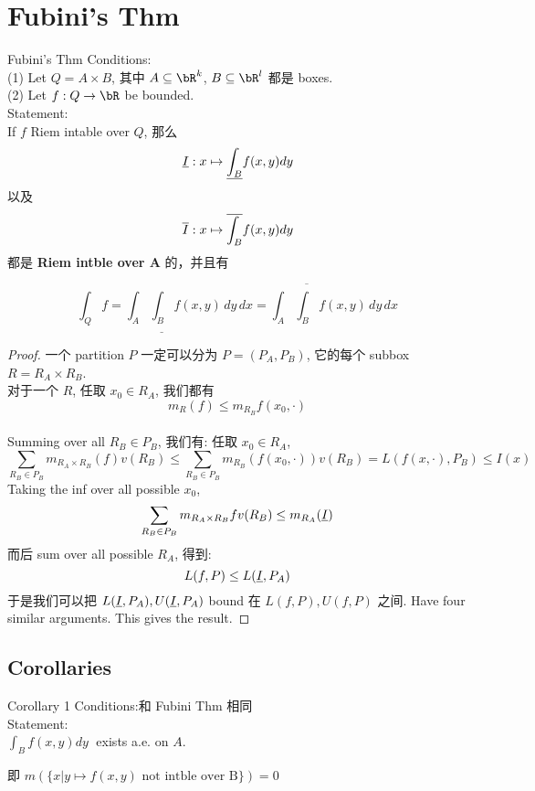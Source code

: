 \documentclass[lang=cn,11pt]{elegantbook}
\begin{document}
\section{Fubini's Thm}
\begin{theorem}{Fubini's Thm}\label{Fubini's Thm}
    Conditions:\\
    (1) Let $Q = A \times B$, 其中 $A \subseteq \bR^k$, $B \subseteq \bR^l$ 都是 boxes.\\
    (2) Let $f: Q \rightarrow \bR$ be bounded.\\
    
    Statement: \\
    If $f$ Riem intable over $Q$, 那么 
    $$
    \underline{I}: x \mapsto \underline{\int_B} f(x,y) dy
    $$
    以及 
    $$
    \overline{I}:  x \mapsto \overline{\int_B} f(x,y) dy
    $$
    都是 \textbf{Riem intble over A} 的，并且有 

    $$
    \int_Q f = \int_A \underline{\int_B} f(x,y) \,dy \,dx = \int_A \overline{\int_B} f(x,y) \,dy \,dx
    $$
    
\end{theorem}
\begin{proof}
    一个 partition $P$ 一定可以分为 $P = (P_A, P_B)$, 它的每个 subbox $R = R_A \times R_B$.\\
    对于一个 $R$, 任取 $x_0 \in R_A$, 我们都有 $$m_R(f) \leq m_{R_B} f(x_0, \cdot)$$\\
    Summing over all $R_B \in P_B$, 我们有: 任取 $x_0 \in R_A$, 
    $$
    \sum_{R_B \in P_B} m_{R_A \times R_B} (f) v(R_B) \leq \sum_{R_B \in P_B} m_{R_B}(f(x_0, \cdot)) v(R_B) = L(f(x,\cdot), P_B) \leq I(x)
    $$
    Taking the inf over all possible $x_0$,
    $$
     \sum_{R_B \in P_B} m_{R_A \times R_B} f v(R_B) \leq m_{R_A}(\underline{I})
    $$
    而后 sum over all possible $R_A$, 得到:
    $$
    L(f,P) \leq L(\underline{I}, P_A)
    $$
    于是我们可以把 $L(\underline{I}, P_A), U(\underline{I}, P_A) $ bound 在 $L(f,P), U(f,P)$ 之间. Have four similar arguments. This gives the result.
\end{proof}



\subsection{Corollaries}

\begin{corollary}{Corollary 1}
    Conditions:和 Fubini Thm 相同\\
    Statement:\\
    $\int_B f(x,y) dy \;$  exists a.e. on $A$.
\end{corollary}
\begin{remark}
    即 $m (\{ x |  y \mapsto f(x,y) \text{ not intble over B} \}) = 0$ 
\end{remark}
\end{document}
